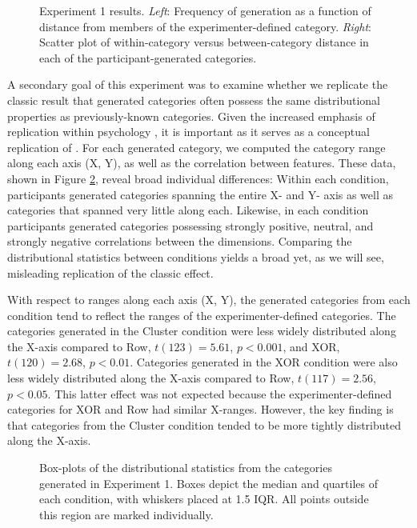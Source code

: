 \documentclass[12pt]{article}
\newcommand\inputpgf[2]{{
\let\pgfimageWithoutPath\pgfimage
\renewcommand{\pgfimage}[2][]{\pgfimageWithoutPath[##1]{#1/##2}}

}}
\begin{document}
\begin{flushleft}
\begin{figure}
    \begin{center} \inputpgf{figs/}{e1-distanceplots.pgf}
    \caption{Experiment 1 results. {\em Left}: Frequency of generation as a
function of distance from members of the experimenter-defined category. {\em
Right}: Scatter plot of within-category versus between-category distance in each
of the participant-generated categories.}
    \label{fig:e1-distanceplots}
    \end{center}
\end{figure}

A secondary goal of this experiment was to examine whether we replicate the
classic result that generated categories often possess the same distributional
properties as previously-known categories. Given the increased emphasis of replication within psychology \citep{zwaan2017}, it is important as it serves as a conceptual replication of \citet{jern2013probabilistic}. For each generated category, we
computed the category range along each axis (X, Y), as well as the correlation
between features. These data, shown in Figure \ref{fig:e1-statsboxes}, reveal
broad individual differences: Within each condition, participants generated
categories spanning the entire X- and Y- axis as well as categories that spanned
very little along each. Likewise, in each condition participants generated
categories possessing strongly positive, neutral, and strongly negative
correlations between the dimensions. Comparing the distributional statistics
between conditions yields a broad yet, as we will see, misleading replication of
the classic effect.

With respect to ranges along each axis (X, Y), the generated categories from
each condition tend to reflect the ranges of the experimenter-defined
categories. The categories generated in the Cluster condition were less widely
distributed along the X-axis compared to Row, $t(123) = 5.61$, $p < 0.001$, and
XOR, $t(120) = 2.68$, $p < 0.01$. Categories generated in the XOR condition
were also less widely distributed along the X-axis compared to Row, $t(117) =
2.56$, $p < 0.05$. This latter effect was not expected because the
experimenter-defined categories for XOR and Row had similar X-ranges. However,
the key finding is that categories from the Cluster condition tended to be more
tightly distributed along the X-axis.

\begin{figure}
    \begin{center} \inputpgf{figs/}{e1-statsboxes.pgf}
    \caption{Box-plots of the distributional statistics from the categories
generated in Experiment 1. Boxes depict the median and quartiles of each
condition, with whiskers placed at 1.5 IQR. All points outside this region are
marked individually.}
    \label{fig:e1-statsboxes}
    \end{center}
\end{figure}



\end{flushleft}
\end{document}
